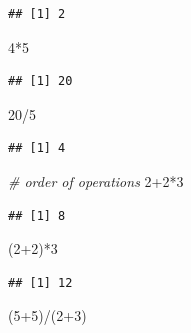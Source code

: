 \documentclass[
  12pt,
]{style/krantz}
\newenvironment{Shaded}{\begin{snugshade}}{\end{snugshade}}
\newcommand{\CommentTok}[1]{\textcolor[rgb]{0.56,0.35,0.01}{\textit{#1}}}
\newcommand{\DecValTok}[1]{\textcolor[rgb]{0.00,0.00,0.81}{#1}}
\newcommand{\NormalTok}[1]{#1}
\newcommand{\SpecialCharTok}[1]{\textcolor[rgb]{0.00,0.00,0.00}{#1}}
\begin{document}
\begin{verbatim}
## [1] 2
\end{verbatim}

\begin{Shaded}
\begin{Highlighting}[]
\DecValTok{4}\SpecialCharTok{*}\DecValTok{5}
\end{Highlighting}
\end{Shaded}

\begin{verbatim}
## [1] 20
\end{verbatim}

\begin{Shaded}
\begin{Highlighting}[]
\DecValTok{20}\SpecialCharTok{/}\DecValTok{5}
\end{Highlighting}
\end{Shaded}

\begin{verbatim}
## [1] 4
\end{verbatim}

\begin{Shaded}
\begin{Highlighting}[]
\CommentTok{\# order of operations}
\DecValTok{2}\SpecialCharTok{+}\DecValTok{2}\SpecialCharTok{*}\DecValTok{3}
\end{Highlighting}
\end{Shaded}

\begin{verbatim}
## [1] 8
\end{verbatim}

\begin{Shaded}
\begin{Highlighting}[]
\NormalTok{(}\DecValTok{2}\SpecialCharTok{+}\DecValTok{2}\NormalTok{)}\SpecialCharTok{*}\DecValTok{3}
\end{Highlighting}
\end{Shaded}

\begin{verbatim}
## [1] 12
\end{verbatim}

\begin{Shaded}
\begin{Highlighting}[]
\NormalTok{(}\DecValTok{5}\SpecialCharTok{+}\DecValTok{5}\NormalTok{)}\SpecialCharTok{/}\NormalTok{(}\DecValTok{2}\SpecialCharTok{+}\DecValTok{3}\NormalTok{)}
\end{Highlighting}
\end{Shaded}
\end{document}
